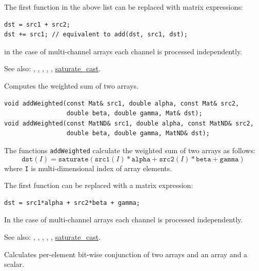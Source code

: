 The first function in the above list can be replaced with matrix expressions:
\begin{lstlisting}
dst = src1 + src2;
dst += src1; // equivalent to add(dst, src1, dst);
\end{lstlisting}

in the case of multi-channel arrays each channel is processed independently.

See also: , , , ,
, \hyperref[saturatecast]{saturate\_cast}.

\label{addWeighted}
Computes the weighted sum of two arrays.

\begin{lstlisting}
void addWeighted(const Mat& src1, double alpha, const Mat& src2,
                 double beta, double gamma, Mat& dst);
void addWeighted(const MatND& src1, double alpha, const MatND& src2,
                 double beta, double gamma, MatND& dst);
\end{lstlisting}
\begin{description}
\end{description}

The functions \texttt{addWeighted} calculate the weighted sum of two arrays as follows:
\[\texttt{dst}(I)=\texttt{saturate}(\texttt{src1}(I)*\texttt{alpha} + \texttt{src2}(I)*\texttt{beta} + \texttt{gamma})\]
where \texttt{I} is multi-dimensional index of array elements.

The first function can be replaced with a matrix expression:
\begin{lstlisting}
dst = src1*alpha + src2*beta + gamma;
\end{lstlisting}

In the case of multi-channel arrays each channel is processed independently.

See also: , , , ,
, \hyperref[saturatecast]{saturate\_cast}.

\label{bitwise and}
Calculates per-element bit-wise conjunction of two arrays and an array and a scalar.

